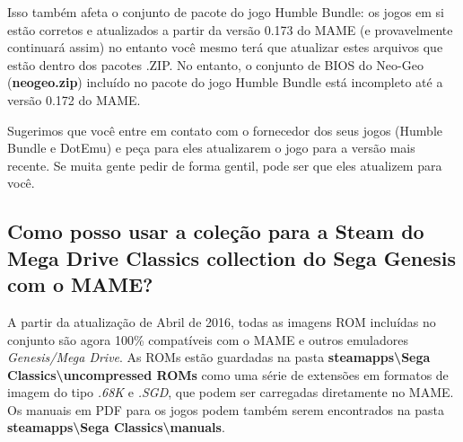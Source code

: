 \documentclass[letterpaper,10pt,brazil]{sphinxmanual}
\begin{document}
Isso também afeta o conjunto de pacote do jogo Humble Bundle:
os jogos em si estão corretos e atualizados a partir da versão 0.173 do
MAME (e provavelmente continuará assim) no entanto você mesmo terá que
atualizar estes arquivos que estão dentro dos pacotes .ZIP.
No entanto, o conjunto de BIOS do Neo-Geo (\textbf{neogeo.zip}) incluído no
pacote do jogo Humble Bundle está incompleto até a versão 0.172 do MAME.

Sugerimos que você entre em contato com o fornecedor dos seus jogos
(Humble Bundle e DotEmu) e peça para eles atualizarem o jogo para a
versão mais recente. Se muita gente pedir de forma gentil, pode ser que
eles atualizem para você.


\subsection{Como posso usar a coleção para a Steam do Mega Drive Classics collection do Sega Genesis com o MAME?}
\label{usingmame/commonissues:sega-sgmdc}\label{usingmame/commonissues:como-posso-usar-a-colecao-para-a-steam-do-mega-drive-classics-collection-do-sega-genesis-com-o-mame}
A partir da atualização de Abril de 2016, todas as imagens ROM incluídas
no conjunto são agora 100\% compatíveis com o MAME e outros emuladores
\emph{Genesis/Mega Drive}. As ROMs estão guardadas na pasta
\textbf{steamapps\textbackslash{}Sega Classics\textbackslash{}uncompressed ROMs} como uma série de
extensões em formatos de imagem do tipo \emph{.68K} e \emph{.SGD}, que podem ser
carregadas diretamente no MAME. Os manuais em PDF para os jogos podem
também serem encontrados na pasta \textbf{steamapps\textbackslash{}Sega Classics\textbackslash{}manuals}.
\end{document}
